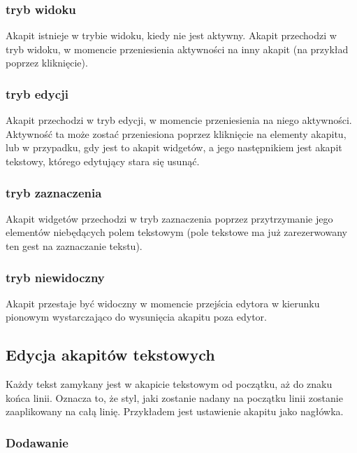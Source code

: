 \subsubsection{tryb widoku}

Akapit istnieje w trybie widoku, kiedy nie jest aktywny.
Akapit przechodzi w tryb widoku, w momencie przeniesienia aktywności na inny akapit (na przykład poprzez kliknięcie).

\subsubsection{tryb edycji}

Akapit przechodzi w tryb edycji, w momencie przeniesienia na niego aktywności.
Aktywność ta może zostać przeniesiona poprzez kliknięcie na elementy akapitu, lub w przypadku, gdy jest to akapit widgetów, a jego następnikiem jest akapit tekstowy, którego edytujący stara się usunąć.

\subsubsection{tryb zaznaczenia}

Akapit widgetów przechodzi w tryb zaznaczenia poprzez przytrzymanie jego elementów niebędących polem tekstowym (pole tekstowe ma już zarezerwowany ten gest na zaznaczanie tekstu).

\subsubsection{tryb niewidoczny}

Akapit przestaje być widoczny w momencie przejścia edytora w kierunku pionowym wystarczająco do wysunięcia akapitu poza edytor.

\pagebreak

\subsection{Edycja akapitów tekstowych}

Każdy tekst zamykany jest w akapicie tekstowym od początku, aż do znaku końca linii. Oznacza to, że styl, jaki zostanie nadany na początku linii zostanie zaaplikowany na całą linię. Przykładem jest ustawienie akapitu jako nagłówka.

\subsubsection{Dodawanie}


